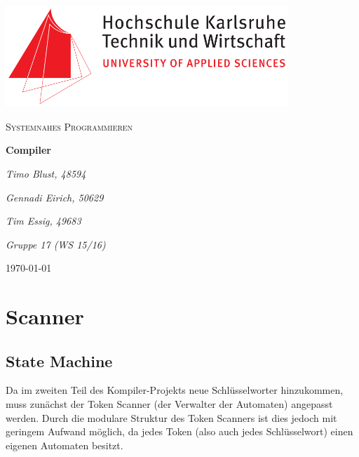 \documentclass[
a4paper
]{scrreprt}
\begin{document}
\sffamily %


\begin{titlepage}
\centering
\includegraphics[width=0.8\textwidth]{./images/logo_hska.png}\par\vspace{1cm}
\vspace{1cm}

{\scshape\Large Systemnahes Programmieren\par}
\vspace{1.5cm}

{\huge\textbf{Compiler}\par}
\vspace{2cm}

{\Large\itshape Timo Blust, 48594\par}
{\Large\itshape Gennadi Eirich, 50629\par}
{\Large\itshape Tim Essig, 49683\par\par}
\vspace{2cm}

{\Large\itshape Gruppe 17 (WS 15/16)\par}

\vfill

{\large \today\par}
\end{titlepage}


\tableofcontents

\chapter{Scanner}
\section{State Machine}
Da im zweiten Teil des Kompiler-Projekts neue Schlüsselworter hinzukommen, muss zunächst der Token Scanner (der Verwalter der Automaten) angepasst werden. Durch die modulare Struktur des Token Scanners ist dies jedoch mit geringem Aufwand möglich, da jedes Token (also auch jedes Schlüsselwort) einen eigenen Automaten besitzt.
\end{document}
